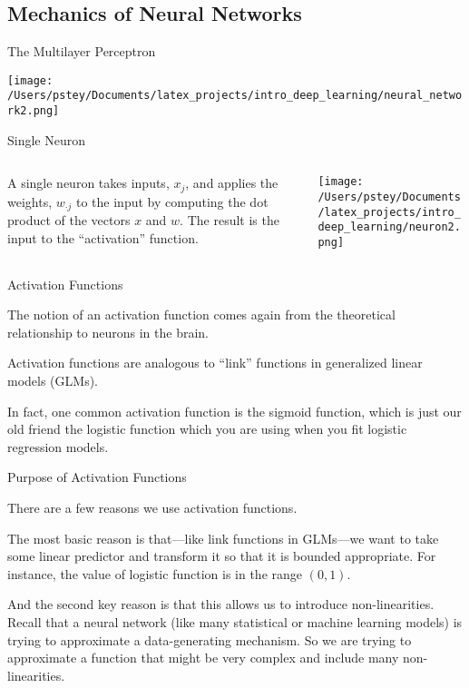 \documentclass[pdf]{beamer}
\begin{document}
\subsection{Mechanics of Neural Networks}
	\begin{frame}{The Multilayer Perceptron}
	\begin{center}
		\texttt{[image: /Users/pstey/Documents/latex\_projects/intro\_deep\_learning/neural\_network2.png]}
	\end{center}
	\end{frame}

	\begin{frame}{Single Neuron}
	\begin{columns}
		\begin{column}{0.5\textwidth}
		A single neuron takes inputs, $x_j$, and applies the weights, $w_{\cdot j}$ to the input by computing the dot product of the vectors $x$ and $w$. The result is the input to the ``activation'' function.

		\end{column}
	
		\begin{column}{0.5\textwidth}
		\texttt{[image: /Users/pstey/Documents/latex\_projects/intro\_deep\_learning/neuron2.png]}
		\end{column}
	\end{columns}
	\end{frame}

	\begin{frame}{Activation Functions}
	
	The notion of an activation function comes again from the theoretical relationship to neurons in the brain.
	\vspace{2em}
	
	Activation functions are analogous to ``link'' functions in generalized linear models (GLMs). 
	
	\vspace{2em} 
	In fact, one common activation function is the sigmoid function, which is just our old friend the logistic function which you are using when you fit logistic regression models.
	\end{frame}
	
	
	\begin{frame}{Purpose of Activation Functions}
	
	There are a few reasons we use activation functions.	
	\vspace{2em}
	
	The most basic reason is that---like link functions in GLMs---we want to take some linear predictor and transform it so that it is bounded appropriate. For instance, the value of logistic function is in the range $(0, 1)$. 
	
	\vspace{2em}
	
	And the second key reason is that this allows us to introduce non-linearities. Recall that a neural network (like many statistical or machine learning models) is trying to approximate a data-generating mechanism. So we are trying to approximate a function that might be very complex and include many non-linearities.
	\end{frame}
	
\end{document}
